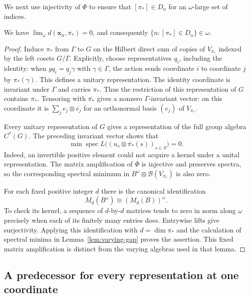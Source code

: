 We next use injectivity of $\Phi$ to ensure that $[\pi_*]\in D_n$
for an $\omega$-large set of indices.

\begin{lemma}\label{lem:initial-match}
We have $\lim_\omega d(\mathbf x_n,\pi_*)=0$, and consequently
$\{n:[\pi_*]\in D_n\}\in\omega$.
\end{lemma}

\begin{proof}
Induce $\pi_*$ from $\Gamma$ to $G$ on the Hilbert direct sum of
copies of $V_{\pi_*}$ indexed by the left cosets $G/\Gamma$.
Explicitly, choose representatives $q_i$, including the identity:
when $gq_i=q_j\gamma$ with $\gamma\in\Gamma$, the action sends
coordinate $i$ to coordinate $j$ by $\pi_*(\gamma)$.  This defines
a unitary representation.  The identity coordinate is invariant
under $\Gamma$ and carries $\pi_*$.  Thus the restriction of this representation
of $G$ contains $\pi_*$.  Tensoring with $\overline{\pi_*}$ gives a
nonzero $\Gamma$-invariant vector: on this coordinate it is
$\sum_j e_j\otimes\overline{e_j}$ for an orthonormal basis $(e_j)$ of
$V_{\pi_*}$.

Every unitary representation of $G$ gives a representation of the
full group algebra $C^*(G)$.  The preceding invariant vector shows that
\[
 \min\operatorname{spec}
 L\big((u_s\otimes\overline{\pi_*}(s))_{s\in S}\big)=0.
\]
Indeed, an invertible positive element could not acquire a kernel
under a unital representation.  The matrix amplification of $\Phi$
is injective and preserves spectra, so the corresponding spectral
minimum in $B^\omega\otimes\mathcal B(\overline{V_{\pi_*}})$ is also
zero.

For each fixed positive integer $d$ there is the canonical
identification
\[
 M_d(B^\omega)\cong (M_d(B))^\omega.
\]
To check its kernel, a sequence of $d$-by-$d$ matrices tends to zero in
norm along $\omega$ precisely when each of its finitely many entries
does.  Entrywise lifts give surjectivity.  Applying this identification
with $d=\dim\pi_*$ and the calculation of spectral minima in
Lemma~\ref{lem:varying-gap} proves the assertion.  This fixed matrix
amplification is distinct from the varying algebras used in that lemma.
\end{proof}

\subsection{A predecessor for every representation at one coordinate}


